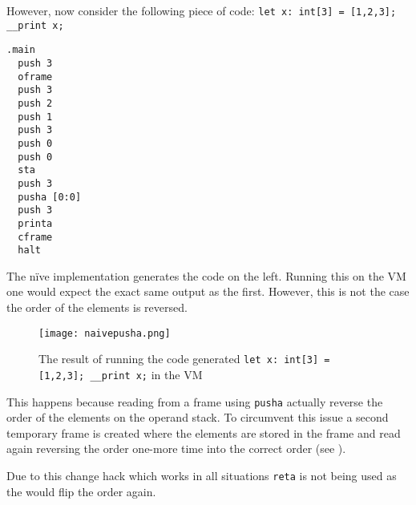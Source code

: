 However, now consider the following piece of code: \texttt{let
x: int[3] = [1,2,3]; \_\_print x;}

\begin{minipage}[l]{0.2\linewidth}
\begin{lstlisting}[morekeywords={sta, push, pusha, printa, oframe,
cframe, halt}]
  .main
  push 3
  oframe
  push 3
  push 2
  push 1
  push 3
  push 0
  push 0
  sta
  push 3
  pusha [0:0]
  push 3
  printa
  cframe
  halt
\end{lstlisting}
\end{minipage}
\hfill\begin{minipage}[t][10em][t]{0.7\linewidth}
The nïve implementation generates the code on
the left. Running this on the VM one would
expect the exact same output as the first.
However, this is not the case the order of the
elements is reversed.
\end{minipage}

\begin{figure}[H]
    \centering
    \texttt{[image: naivepusha.png]}
    \caption{The result of running the code generated
    \texttt{let x: int[3] = [1,2,3]; \_\_print x;} in the VM}
\end{figure}

This happens because reading from a frame using \texttt{pusha}
actually reverse the order of the elements on the operand stack.
To circumvent this issue a second temporary frame is created
where the elements are stored in the frame and read again
reversing the order one-more time into the correct order (see
).

Due to this change hack which works in all situations
\texttt{reta} is not being used as the would flip the order
again.
